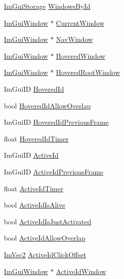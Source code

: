\begin{DoxyCompactItemize}
\hyperlink{struct_im_gui_storage}{Im\+Gui\+Storage} \hyperlink{struct_im_gui_context_adc1e46e1c1582a0f0eb74d957efedf98}{Windows\+By\+Id}
\item 
\hyperlink{struct_im_gui_window}{Im\+Gui\+Window} $\ast$ \hyperlink{struct_im_gui_context_aa923044f396241668aef5ed2f4c4d847}{Current\+Window}
\item 
\hyperlink{struct_im_gui_window}{Im\+Gui\+Window} $\ast$ \hyperlink{struct_im_gui_context_ae06077e45c894488b28baaf2d7ff8e41}{Nav\+Window}
\item 
\hyperlink{struct_im_gui_window}{Im\+Gui\+Window} $\ast$ \hyperlink{struct_im_gui_context_a6dd89693704216a036d2676b8c6610f8}{Hovered\+Window}
\item 
\hyperlink{struct_im_gui_window}{Im\+Gui\+Window} $\ast$ \hyperlink{struct_im_gui_context_ae5dcb8bed41ff948af2cfba6c9ae36d9}{Hovered\+Root\+Window}
\item 
Im\+Gui\+ID \hyperlink{struct_im_gui_context_a32bef5a7740179ad8076643b001f15e4}{Hovered\+Id}
\item 
bool \hyperlink{struct_im_gui_context_a171f67ac705994d413a0bccf491aa4e1}{Hovered\+Id\+Allow\+Overlap}
\item 
Im\+Gui\+ID \hyperlink{struct_im_gui_context_a08742c14087e26304ff47fb9212d8eb6}{Hovered\+Id\+Previous\+Frame}
\item 
float \hyperlink{struct_im_gui_context_a07a6bd929503077394ea0f80965470f9}{Hovered\+Id\+Timer}
\item 
Im\+Gui\+ID \hyperlink{struct_im_gui_context_a11c874eb6cf74ba9162bd1d01c4ccbcc}{Active\+Id}
\item 
Im\+Gui\+ID \hyperlink{struct_im_gui_context_af58aa479f6c97819694f1709b62c70d8}{Active\+Id\+Previous\+Frame}
\item 
float \hyperlink{struct_im_gui_context_a9deb2b22abfb5a4fd306371b19e2b9c4}{Active\+Id\+Timer}
\item 
bool \hyperlink{struct_im_gui_context_a3b28802a3a394f032264d36d5a5a00e0}{Active\+Id\+Is\+Alive}
\item 
bool \hyperlink{struct_im_gui_context_aa539096bf2b0ab28e0dbf73d595c64d8}{Active\+Id\+Is\+Just\+Activated}
\item 
bool \hyperlink{struct_im_gui_context_ab3234556023eabcfed157b79ba4c5869}{Active\+Id\+Allow\+Overlap}
\item 
\hyperlink{struct_im_vec2}{Im\+Vec2} \hyperlink{struct_im_gui_context_a28afb4e9b4ac155825f4b4c94cdc516c}{Active\+Id\+Click\+Offset}
\item 
\hyperlink{struct_im_gui_window}{Im\+Gui\+Window} $\ast$ \hyperlink{struct_im_gui_context_a95a35b5d82d3fdea28b71580dc6a9618}{Active\+Id\+Window}

\end{DoxyCompactItemize}
